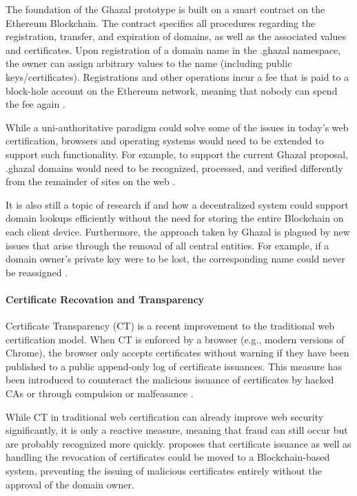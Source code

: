 The foundation of the Ghazal prototype is built on a smart contract on the Ethereum Blockchain. The contract specifies all procedures regarding the registration, transfer, and expiration of domains, as well as the associated values and certificates. Upon registration of a domain name in the .ghazal namespace, the owner can assign arbitrary values to the name (including public keys/certificates). Registrations and other operations incur a fee that is paid to a block-hole account on the Ethereum network, meaning that nobody can spend the fee again \cite{zohar_ghazal:_2019}.

While a uni-authoritative paradigm could solve some of the issues in today's web certification, browsers and operating systems would need to be extended to support such functionality. For example, to support the current Ghazal proposal, .ghazal domains would need to be recognized, processed, and verified differently from the remainder of sites on the web \cite{zohar_ghazal:_2019}.

It is also still a topic of research if and how a decentralized system could support domain lookups efficiently without the need for storing the entire Blockchain on each client device. Furthermore, the approach taken by Ghazal is plagued by new issues that arise through the removal of all central entities. For example, if a domain owner's private key were to be lost, the corresponding name could never be reassigned \cite{zohar_ghazal:_2019}.

\paragraph{Certificate Recovation and Transparency}

Certificate Transparency (CT) is a recent improvement to the traditional web certification model. When CT is enforced by a browser (e.g., modern versions of Chrome), the browser only accepts certificates without warning if they have been published to a public append-only log of certificate issuances. This measure has been introduced to counteract the malicious issuance of certificates by hacked CAs or through compulsion or malfeasance \cite{zohar_blockchain-based_2019}.

While CT in traditional web certification can already improve web security significantly, it is only a reactive measure, meaning that fraud can still occur but are probably recognized more quickly. \cite{zohar_blockchain-based_2019} proposes that certificate issuance as well as handling the revocation of certificates could be moved to a Blockchain-based system, preventing the issuing of malicious certificates entirely without the approval of the domain owner.

